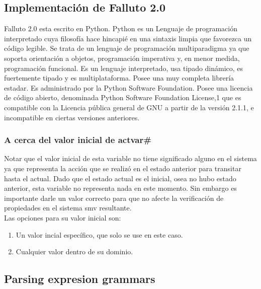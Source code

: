 \documentclass[titlepage, 10pt]{article}
\begin{document}
\subsection{Implementaci\'on de Falluto 2.0}

Falluto 2.0 esta escrito en Python\cite{Python}. Python es un Lenguaje de programación interpretado cuya filosof\'ia hace hincapi\'e en una sintaxis limpia que favorezca un c\'odigo legible.
Se trata de un lenguaje de programaci\'on multiparadigma ya que soporta orientaci\'on a objetos, programaci\'on imperativa y, en menor medida, programaci\'on funcional. Es un lenguaje interpretado, usa tipado din\'amico, es fuertemente tipado y es multiplataforma. Posee una muy completa librer\'ia estadar.
Es administrado por la Python Software Foundation. Posee una licencia de c\'odigo abierto, denominada Python Software Foundation License,1 que es compatible con la Licencia p\'ublica general de GNU a partir de la versión 2.1.1, e incompatible en ciertas versiones anteriores.


\subsubsection{A cerca del valor inicial de actvar\#}

Notar que el valor inicial de esta variable no tiene significado alguno en el
sistema ya que representa la acci\'{o}n que se realiz\'{o} en el estado anterior para 
transitar hasta el actual. Dado que el estado actual es el inicial, osea no hubo
estado anterior, esta variable no representa nada en este momento. Sin embargo
es importante darle un valor correcto para que no afecte la verificaci\'{o}n de
propiedades en el sistema smv resultante.\\

\noindent Las opciones para su valor inicial son:\\
\begin{enumerate}

\item%
    Un valor incial espec\'{i}fico, que solo se use en este caso.
\item%
    Cualquier valor dentro de su dominio.
\end{enumerate}






\subsection{Parsing expresion grammars}
\end{document}
